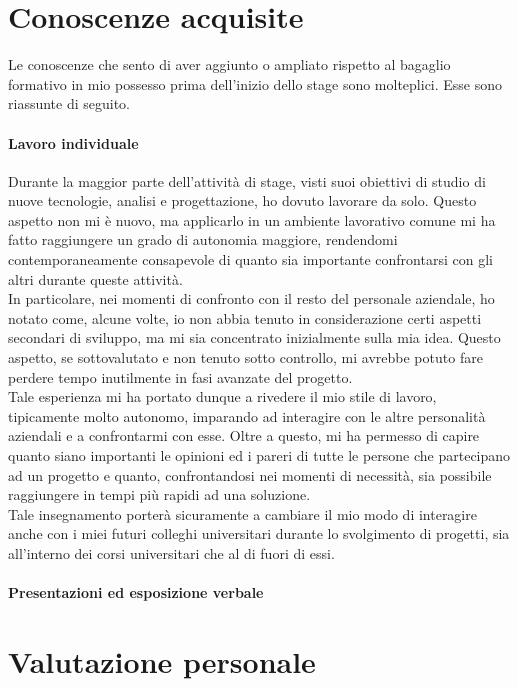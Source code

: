 \section{Conoscenze acquisite}
Le conoscenze che sento di aver aggiunto o ampliato rispetto al bagaglio formativo in mio possesso prima dell'inizio dello stage sono molteplici. Esse sono riassunte di seguito.

\paragraph{Lavoro individuale}
Durante la maggior parte dell'attività di stage, visti suoi obiettivi di studio di nuove tecnologie, analisi e progettazione, ho dovuto lavorare da solo. Questo aspetto non mi è nuovo, ma applicarlo in un ambiente lavorativo comune mi ha fatto raggiungere un grado di autonomia maggiore, rendendomi contemporaneamente consapevole di quanto sia importante confrontarsi con gli altri durante queste attività. \\
In particolare, nei momenti di confronto con il resto del personale aziendale, ho notato come, alcune volte, io non abbia tenuto in considerazione certi aspetti secondari di sviluppo, ma mi sia concentrato inizialmente sulla mia idea. Questo aspetto, se sottovalutato e non tenuto sotto controllo, mi avrebbe potuto fare perdere tempo inutilmente in fasi avanzate del progetto.\\
Tale esperienza mi ha portato dunque a rivedere il mio stile di lavoro, tipicamente molto autonomo, imparando ad interagire con le altre personalità aziendali e a confrontarmi con esse. Oltre a questo, mi ha permesso di capire quanto siano importanti le opinioni ed i pareri di tutte le persone che partecipano ad un progetto e quanto, confrontandosi nei momenti di necessità, sia possibile raggiungere in tempi più rapidi ad una soluzione. \\
Tale insegnamento porterà sicuramente a cambiare il mio modo di interagire anche con i miei futuri colleghi universitari durante lo svolgimento di progetti, sia all'interno dei corsi universitari che al di fuori di essi.
\paragraph{}
\paragraph{Presentazioni ed esposizione verbale}

\section{Valutazione personale}